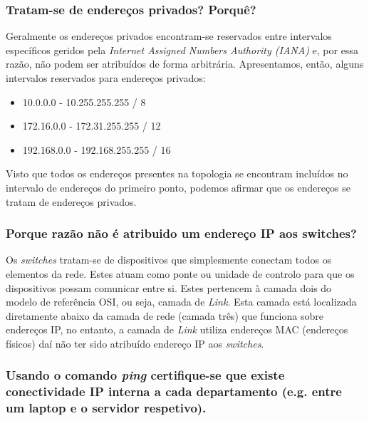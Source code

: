     
    

\subsubsection{Tratam-se de endereços privados? Porquê?}
    
    \par Geralmente os endereços privados encontram-se reservados entre intervalos específicos geridos pela \textit{Internet Assigned Numbers Authority (IANA)} e, por essa razão, não podem ser atribuídos de forma arbitrária. Apresentamos, então, alguns intervalos reservados para endereços privados: 
    
        \begin{itemize}
            \item 10.0.0.0 - 10.255.255.255 / 8
            \item 172.16.0.0 - 172.31.255.255 / 12
            \item 192.168.0.0 - 192.168.255.255 / 16
        \end{itemize}
        
        \par Visto que todos os endereços presentes na topologia se encontram incluídos no intervalo de endereços do primeiro ponto, podemos afirmar que os endereços se tratam de endereços privados.
        
        
        
        
    
\subsubsection{Porque razão não é atribuido um endereço IP aos switches?}

    \par Os \textit{switches} tratam-se de dispositivos que simplesmente conectam todos os elementos da rede. Estes atuam como ponte ou unidade de controlo para que os dispositivos possam comunicar entre si.
    Estes pertencem à camada dois do modelo de referência OSI, ou seja, camada de \textit{Link}. Esta camada está localizada diretamente abaixo da camada de rede (camada três) que funciona sobre endereços IP, no entanto, a camada de \textit{Link} utiliza endereços MAC (endereços físicos) daí não ter sido atribuído endereço IP aos \textit{switches}.  
    
    
    
    
    
\subsubsection{Usando o comando \textit{\textbf{ping}} certifique-se que existe conectividade IP interna a cada departamento (e.g. entre um laptop e o servidor respetivo).}

